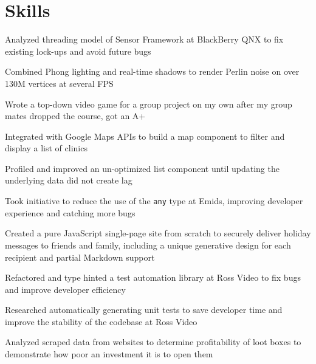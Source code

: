 \section{Skills}

\begin{bullets}
	\item Analyzed threading model of Sensor Framework at BlackBerry QNX to fix existing lock-ups and avoid future bugs
	\item Combined Phong lighting and real-time shadows to render Perlin noise on over 130M vertices at several FPS
    \item Wrote a top-down video game for a group project on my own after my group mates dropped the course, got an A+
\end{bullets}

\begin{bullets}
    \item Integrated with Google Maps APIs to build a map component to filter and display a list of clinics
    \item Profiled and improved an un-optimized list component until updating the underlying data did not create lag
    \item Took initiative to reduce the use of the \texttt{any} type at Emids, improving developer experience and catching more bugs
    \item Created a pure JavaScript single-page site from scratch to securely deliver holiday messages to friends and family, including a unique generative design for each recipient and partial Markdown support
\end{bullets}

\begin{bullets}
    \item Refactored and type hinted a test automation library at Ross Video to fix bugs and improve developer efficiency
    \item Researched automatically generating unit tests to save developer time and improve the stability of the codebase at Ross Video
    \item Analyzed scraped data from websites to determine profitability of loot boxes to demonstrate how poor an investment it is to open them
\end{bullets}


